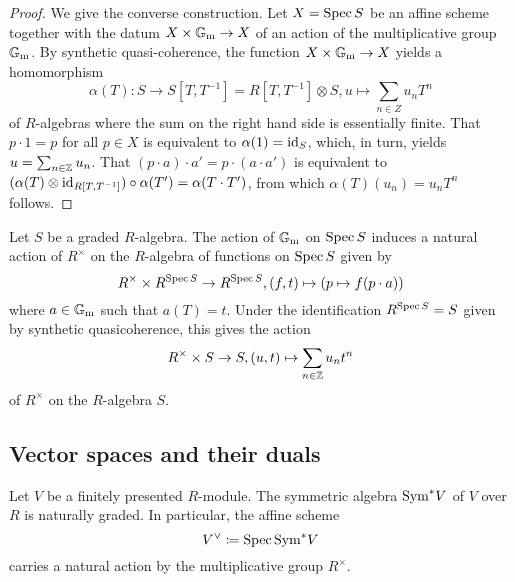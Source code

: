 \begin{proof}
  We give the converse construction.  Let $X = \operatorname{Spec} S$ be an affine
  scheme together with the datum $X \times \mathbb{G}_\mathrm{m} \to X$ of an action of
  the multiplicative group $\mathbb{G}_\mathrm{m}$.  By synthetic quasi-coherence, the
  function $X \times \mathbb{G}_\mathrm{m} \to X$ yields a homomorphism
  \begin{equation*}
    \alpha(T)\colon S \to S[T, T^{-1}] = R[T, T^{-1}] \otimes S, u \mapsto \sum_{n \in Z} u_n T^n
  \end{equation*}
  of $R$-algebras where the sum on the right hand side is essentially
  finite.  That $p \cdot 1 = p$ for all $p \in X$ is equivalent to
  $\alpha(1) = \mathrm{id}_S$, which, in turn, yields
  $u = \sum_{n \in \mathbb{Z}} u_n$.  That $(p \cdot a) \cdot a' = p \cdot (a \cdot a')$ is equivalent to
  $(\alpha(T) \otimes \mathrm{id}_{R[T, T^{-1}]}) \circ \alpha(T') = \alpha(T \cdot T')$, from which $\alpha(T) (u_n) = u_n T^n$ follows.
\end{proof}

\begin{remark}
  Let $S$ be a graded $R$-algebra.  The action of $\mathbb{G}_\mathrm{m}$ on $\operatorname{Spec} S$ induces a natural action of $R^\times$ on the $R$-algebra of functions
  on $\operatorname{Spec} S$ given by
  \begin{equation*}
    R^\times \times R^{\operatorname{Spec} S} \to R^{\operatorname{Spec} S}, (f, t) \mapsto (p \mapsto f(p \cdot a))
  \end{equation*}
  where $a \in \mathbb{G}_\mathrm{m}$ such that $a(T) = t$.
  Under the identification $R^{\operatorname{Spec} S} = S$ given by synthetic quasicoherence, this gives the action
  \begin{equation*}
    R^\times \times S \to S, (u, t) \mapsto \sum_{n \in \mathbb{Z}} u_n t^n
  \end{equation*}
  of $R^\times$ on the $R$-algebra $S$.
\end{remark}

\subsection{Vector spaces and their duals}

\begin{example}
  Let $V$ be a finitely presented $R$-module.  The symmetric algebra
  $\mathrm{Sym}^* V$ of $V$ over $R$ is naturally graded.  In particular, the
  affine scheme
  \begin{equation*}
    V\spcheck \coloneqq \Spec \Sym^* V
  \end{equation*}
  carries a natural action by the multiplicative group $R^\times$.
\end{example}

